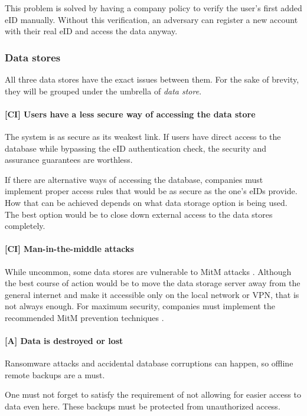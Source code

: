 This problem is solved by having a company policy to verify the user's first added eID manually. Without this verification, an adversary can register a new account with their real eID and access the data anyway.

\subsubsection{Data stores}

All three data stores have the exact issues between them. For the sake of brevity, they will be grouped under the umbrella of \textit{data store}.

\paragraph{[CI] Users have a less secure way of accessing the data store}

The system is as secure as its weakest link. If users have direct access to the database while bypassing the eID authentication check, the security and assurance guarantees are worthless.

If there are alternative ways of accessing the database, companies must implement proper access rules that would be as secure as the one's eIDs provide. How that can be achieved depends on what data storage option is being used. The best option would be to close down external access to the data stores completely.

\paragraph{[CI] Man-in-the-middle attacks} While uncommon, some data stores are vulnerable to MitM attacks \cite{sql-server-auth-mitm}. Although the best course of action would be to move the data storage server away from the general internet and make it accessible only on the local network or VPN, that is not always enough. For maximum security, companies must implement the recommended MitM prevention techniques \cite{sql-server-enable-tls}.

\paragraph{[A] Data is destroyed or lost}

Ransomware attacks and accidental database corruptions can happen, so offline remote backups are a must.

One must not forget to satisfy the requirement of not allowing for easier access to data even here. These backups must be protected from unauthorized access.

